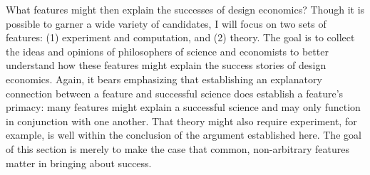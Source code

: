 What features might then explain the successes of design economics? Though it is possible to garner a wide variety of candidates, I will focus on two sets of features: (1) experiment and computation, and (2) theory. The goal is to collect the ideas and opinions of philosophers of science and economists to better understand how these features might explain the success stories of design economics. Again, it bears emphasizing that establishing an explanatory connection between a feature and successful science does establish a feature's primacy: many features might explain a successful science and may only function in conjunction with one another. That theory might also require experiment, for example, is well within the conclusion of the argument established here. The goal of this section is merely to make the case that common, non-arbitrary features matter in bringing about success.



